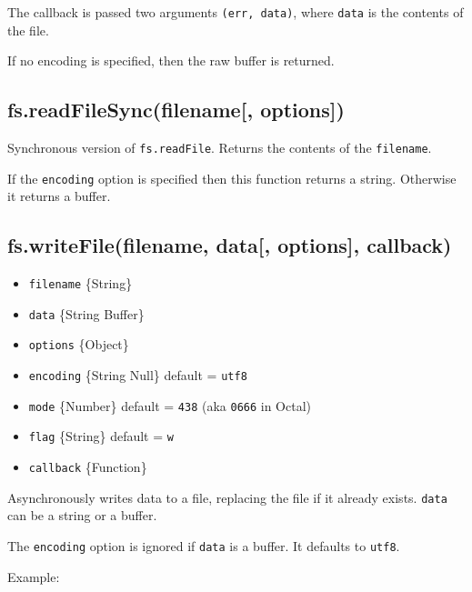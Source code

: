 The callback is passed two arguments \texttt{(err,\ data)}, where
\texttt{data} is the contents of the file.

If no encoding is specified, then the raw buffer is returned.

\subsection{fs.readFileSync(filename{[},
options{]})}\label{fs.readfilesyncfilename-options}

Synchronous version of \texttt{fs.readFile}. Returns the contents of the
\texttt{filename}.

If the \texttt{encoding} option is specified then this function returns
a string. Otherwise it returns a buffer.

\subsection{fs.writeFile(filename, data{[}, options{]},
callback)}\label{fs.writefilefilename-data-options-callback}

\begin{itemize}
\itemsep1pt\parskip0pt
\item
  \texttt{filename} \{String\}
\item
  \texttt{data} \{String \textbar{} Buffer\}
\item
  \texttt{options} \{Object\}
\item
  \texttt{encoding} \{String \textbar{} Null\} default =
  \texttt{\textquotesingle{}utf8\textquotesingle{}}
\item
  \texttt{mode} \{Number\} default = \texttt{438} (aka \texttt{0666} in
  Octal)
\item
  \texttt{flag} \{String\} default =
  \texttt{\textquotesingle{}w\textquotesingle{}}
\item
  \texttt{callback} \{Function\}
\end{itemize}

Asynchronously writes data to a file, replacing the file if it already
exists. \texttt{data} can be a string or a buffer.

The \texttt{encoding} option is ignored if \texttt{data} is a buffer. It
defaults to \texttt{\textquotesingle{}utf8\textquotesingle{}}.

Example:

\begin{Shaded}
\begin{Highlighting}[]
\NormalTok{(}\NormalTok{, }\NormalTok{, } 
    
  \NormalTok{(}\NormalTok{);}
\NormalTok{\});}
\end{Highlighting}
\end{Shaded}

